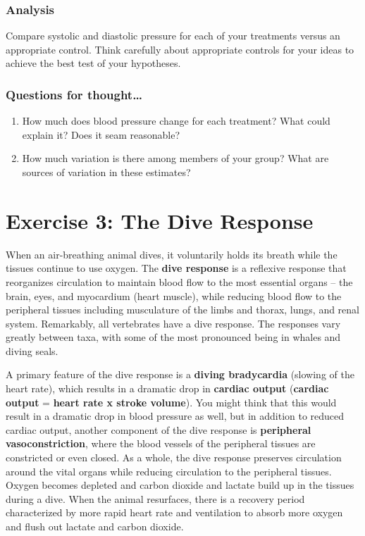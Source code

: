 \documentclass[
  letterpaper,
  DIV=11,
  numbers=noendperiod,
  oneside]{scrartcl}
\providecommand{\tightlist}{%
  \setlength{\itemsep}{0pt}\setlength{\parskip}{0pt}}\usepackage{longtable,booktabs,array}
\begin{document}
\hypertarget{analysis}{%
\subsubsection{Analysis}\label{analysis}}

Compare systolic and diastolic pressure for each of your treatments
versus an appropriate control. Think carefully about appropriate
controls for your ideas to achieve the best test of your hypotheses.

\hypertarget{questions-for-thought-1}{%
\subsubsection{Questions for
thought\ldots{}}\label{questions-for-thought-1}}

\begin{enumerate}
\def\labelenumi{\arabic{enumi}.}
\tightlist
\item
  How much does blood pressure change for each treatment? What could
  explain it? Does it seam reasonable?
\item
  How much variation is there among members of your group? What are
  sources of variation in these estimates?
\end{enumerate}

\hypertarget{exercise-3-the-dive-response}{%
\section{Exercise 3: The Dive
Response}\label{exercise-3-the-dive-response}}

When an air-breathing animal dives, it voluntarily holds its breath
while the tissues continue to use oxygen. The \textbf{dive response} is
a reflexive response that reorganizes circulation to maintain blood flow
to the most essential organs -- the brain, eyes, and myocardium (heart
muscle), while reducing blood flow to the peripheral tissues including
musculature of the limbs and thorax, lungs, and renal system.
Remarkably, all vertebrates have a dive response. The responses vary
greatly between taxa, with some of the most pronounced being in whales
and diving seals.

A primary feature of the dive response is a \textbf{diving bradycardia}
(slowing of the heart rate), which results in a dramatic drop in
\textbf{cardiac output} (\textbf{cardiac output} = \textbf{heart rate x
stroke volume}). You might think that this would result in a dramatic
drop in blood pressure as well, but in addition to reduced cardiac
output, another component of the dive response is \textbf{peripheral
vasoconstriction}, where the blood vessels of the peripheral tissues are
constricted or even closed. As a whole, the dive response preserves
circulation around the vital organs while reducing circulation to the
peripheral tissues. Oxygen becomes depleted and carbon dioxide and
lactate build up in the tissues during a dive. When the animal
resurfaces, there is a recovery period characterized by more rapid heart
rate and ventilation to absorb more oxygen and flush out lactate and
carbon dioxide.
\end{document}
